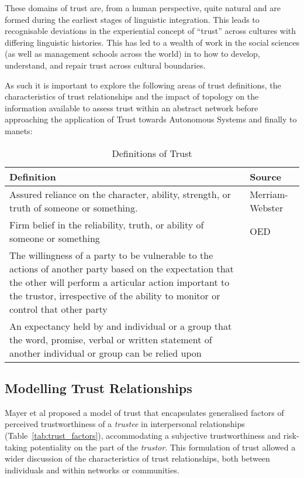 These domains of trust are, from a human perspective, quite natural and are formed during the earliest stages of linguistic integration.
This leads to recognisable deviations in the experiential concept of ``trust'' across cultures with differing linguistic histories.
This has led to a wealth of work in the social sciences (as well as management schools across the world) in to how to develop, understand, and repair trust across cultural boundaries.\cite{Okumura2011} 

As such it is important to explore the following areas of trust definitions, the characteristics of trust relationships and the impact of topology on the information available to assess trust within an abstract network before approaching the application of Trust towards Autonomous Systems and finally to \glspl{manet}:

%
\begin{table}\centering
  \caption{Definitions of Trust}
  \label{tab:trust_definitions}
  \begin{tabularx}{\textwidth}{X p{3cm}}\toprule
    Definition & Source \\ \midrule
    Assured reliance on the character, ability, strength, or truth of someone or something.
    & Merriam-Webster\\
    Firm belief in the reliability, truth, or ability of someone or something & OED\\
    The willingness of a party to be vulnerable to the actions of another party based on the expectation that the other will perform a articular action important to the trustor, irrespective of the ability to monitor or control that other party & \citet{Mayer1995} \\
    An expectancy held by and individual or a group that the word, promise, verbal or written statement of another individual or group can be relied upon & \citet{Rotter1967}\\\bottomrule
  \end{tabularx}
\end{table}
%

\subsection{Modelling Trust Relationships}
Mayer et al \cite{Mayer1995} proposed a model of trust that encapsulates generalised factors of perceived trustworthiness of a \textit{trustee} in interpersonal relationships (Table~\ref{tab:trust_factors}), accommodating a subjective trustworthiness and risk-taking potentiality on the part of the \textit{trustor}.
This formulation of trust allowed a wider discussion of the characteristics of trust relationships, both between individuals and within networks or communities.

